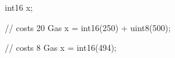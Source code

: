 \begin{soliditybox}
int16 x;

// costs 20 Gas
x = int16(250) + uint8(500);

// costs 8 Gas
x = int16(494);
\end{soliditybox}